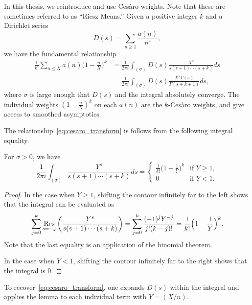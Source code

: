 In this thesis, we reintroduce and use Ces\`{a}ro weights.
Note that these are sometimes referred to as ``Riesz Means.''
Given a positive integer $k$ and a Dirichlet series
\begin{equation}
  D(s) = \sum_{n \geq 1} \frac{a(n)}{n^s},
\end{equation}
we have the fundamental relationship
\begin{equation}\label{eq:cesaro_transform}
  \begin{split}
    \frac{1}{k!} \sum_{n \leq X} a(n) \Big(1 - \frac{n}{X}\Big)^k
    &= \frac{1}{2\pi i} \int_{(\sigma)} D(s) \frac{X^s}{s(s+1)\cdots(s+k)} ds
    \\
    &= \frac{1}{2\pi i} \int_{(\sigma)} D(s) \frac{X^s\Gamma(s)}{\Gamma(s+k+1)} ds,
  \end{split}
\end{equation}
where $\sigma$ is large enough that $D(s)$ and the integral absolutely converge.
The individual weights $(1 - \frac{n}{X})^k$ on each $a(n)$ are the $k$-Ces\`{a}ro
weights, and give access to smoothed asymptotics.

The relationship~\eqref{eq:cesaro_transform} is follows from the following integral
equality.
\begin{lemma}
  For $\sigma > 0$, we have
  \begin{equation}
    \frac{1}{2\pi i} \int_{(\sigma)} \frac{Y^s}{s(s+1)\cdots(s+k)} ds = \begin{cases}
      \frac{1}{k!} \big(1 - \frac{1}{Y}\big)^k & \text{if } Y \geq 1, \\
      0 & \text{if }Y < 1.
    \end{cases}
  \end{equation}
\end{lemma}
\begin{proof}
  In the case when $Y \geq 1$, shifting the contour infinitely far to the left shows that
  the integral can be evaluated as
  \begin{equation}
    \sum_{j = 0}^k \operatorname*{Res}_{s = -j} \bigg( \frac{Y^s}{s(s+1)\cdots(s+k)} \bigg) = \sum_{j =
    0}^k \frac{(-1)^j Y^{-j}}{j! (k-j)!} = \frac{1}{k!} \Big(1 - \frac{1}{Y}\Big)^k.
  \end{equation}
  Note that the last equality is an application of the binomial theorem.

  In the case when $Y < 1$, shifting the contour infinitely far to the right shows that
  the integral is $0$.
\end{proof}

To recover~\eqref{eq:cesaro_transform}, one expands $D(s)$ within the integral and applies
the lemma to each individual term with $Y = (X/n)$.




